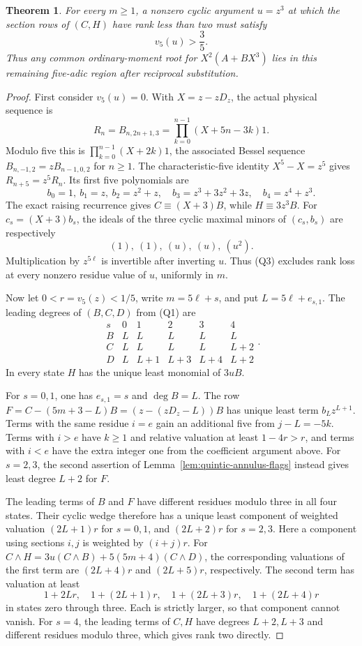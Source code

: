 \documentclass[11pt]{article}
\newtheorem{theorem}{Theorem}
\begin{document}
\begin{theorem}\label{thm:quintic-five-adic-pair-radius}
For every $m\ge1$, a nonzero cyclic argument $u=z^3$ at which
the section rows of $(C,H)$ have rank less than two must satisfy
\[
                         v_5(u)>\frac35.              \tag{Q2}
\]
Thus any common ordinary-moment root for $X^2(A+BX^3)$ lies
in this remaining five-adic region after reciprocal substitution.
\end{theorem}
\begin{proof}
First consider $v_5(u)=0$.
With $X=z-zD_z$, the actual physical sequence is
\[
 R_n=B_{n,2n+1,3}
       =\prod_{k=0}^{n-1}(X+5n-3k)1.
\]
Modulo five this is $\prod_{k=0}^{n-1}(X+2k)1$,
the associated Bessel sequence
$B_{n,-1,2}=zB_{n-1,0,2}$ for $n\ge1$.
The characteristic-five identity $X^5-X=z^5$ gives
$R_{n+5}=z^5R_n$. Its first five polynomials are
\[
 b_0=1,\ b_1=z,\ b_2=z^2+z,\quad
 b_3=z^3+3z^2+3z,\quad b_4=z^4+z^3 .
\]
The exact raising recurrence gives $C\equiv(X+3)B$,
while $H\equiv3z^3B$.
For $c_s=(X+3)b_s$, the ideals of the three cyclic maximal
minors of $(c_s,b_s)$ are respectively
\[
                 (1),\ (1),\ (u),\ (u),\ (u^2).         \tag{Q3}
\]
Multiplication by $z^{5\ell}$ is invertible after inverting $u$.
Thus (Q3) excludes rank loss at every nonzero residue value of
$u$, uniformly in $m$.

Now let $0<r=v_5(z)<1/5$, write $m=5\ell+s$, and put
$L=5\ell+e_{s,1}$.
The leading degrees of $(B,C,D)$ from (Q1) are
\[
 \begin{array}{c|ccccc}
 s&0&1&2&3&4\\\hline
 B&L&L&L&L&L\\
 C&L&L&L&L&L+2\\
 D&L&L+1&L+3&L+4&L+2
 \end{array}.
\]
In every state $H$ has the unique least monomial of $3uB$.

For $s=0,1$, one has $e_{s,1}=s$ and $\deg B=L$.
The row $F=C-(5m+3-L)B=(z-(zD_z-L))B$ has unique least
term $b_Lz^{L+1}$. Terms with the same residue $i=e$ gain
an additional five from $j-L=-5k$.
Terms with $i>e$ have $k\ge1$ and relative valuation
at least $1-4r>r$, and terms with $i<e$ have the extra
integer one from the coefficient argument above.
For $s=2,3$, the second assertion of
Lemma~\ref{lem:quintic-annulus-flags} instead gives least degree
$L+2$ for $F$.

The leading terms of $B$ and $F$ have different residues modulo
three in all four states. Their cyclic wedge therefore has a
unique least component of weighted valuation $(2L+1)r$
for $s=0,1$, and $(2L+2)r$ for $s=2,3$.
Here a component using sections $i,j$ is weighted by $(i+j)r$.
For $C\wedge H=3u(C\wedge B)+5(5m+4)(C\wedge D)$,
the corresponding valuations of the first term are
$(2L+4)r$ and $(2L+5)r$, respectively.
The second term has valuation at least
\[
 1+2Lr,\quad 1+(2L+1)r,\quad
 1+(2L+3)r,\quad 1+(2L+4)r
\]
in states zero through three. Each is strictly larger, so that
component cannot vanish.
For $s=4$, the leading terms of $C,H$ have degrees $L+2,L+3$
and different residues modulo three, which gives rank two directly.


\end{proof}
\end{document}
